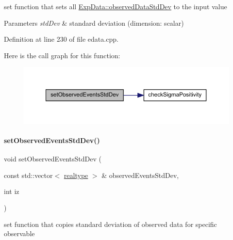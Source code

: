set function that sets all \mbox{\hyperlink{classamici_1_1_exp_data_aa097568cebb4be48c4c1dfaab0c2a159}{Exp\+Data\+::observed\+Data\+Std\+Dev}} to the input value


\begin{DoxyParams}{Parameters}
{\em std\+Dev} & standard deviation (dimension\+: scalar) \\
\hline
\end{DoxyParams}


Definition at line 230 of file edata.\+cpp.

Here is the call graph for this function\+:
\nopagebreak
\begin{figure}[H]
\begin{center}
\leavevmode
\includegraphics[width=350pt]{classamici_1_1_exp_data_a7be54ad0b0116325f4955f10a759a018_cgraph}
\end{center}
\end{figure}
\mbox{\label{classamici_1_1_exp_data_a9fe1de066fcba20ce994d9817442a826}} 
\paragraph{\texorpdfstring{set\+Observed\+Events\+Std\+Dev()}{setObservedEventsStdDev()}\hspace{0.1cm}{\footnotesize\ttfamily [3/4]}}
{\footnotesize\ttfamily void set\+Observed\+Events\+Std\+Dev (\begin{DoxyParamCaption}\item[{const std\+::vector$<$ \mbox{\hyperlink{namespaceamici_a1bdce28051d6a53868f7ccbf5f2c14a3}{realtype}} $>$ \&}]{observed\+Events\+Std\+Dev,  }\item[{int}]{iz }\end{DoxyParamCaption})}

set function that copies standard deviation of observed data for specific observable


